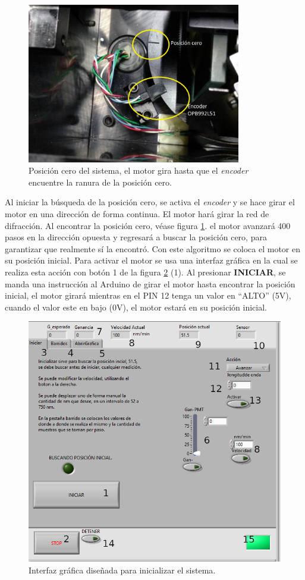 \begin{figure}[h]
	\centering
	\includegraphics[width=0.7\linewidth,height= 7cm]{Imagenes/3/Encoder_01}
	\caption{Posición cero del sistema, el motor gira hasta que el \textit{encoder} encuentre la ranura de la posición cero.}
	\label{fig:encoder01}
\end{figure}

Al iniciar la búsqueda de la posición cero,
se activa el \textit{encoder} y se hace girar el motor en una dirección de forma continua. El motor hará girar la red de difracción. Al encontrar la posición cero, véase figura \ref{fig:encoder01}. el motor avanzará 400 pasos en la dirección opuesta y regresará a buscar la posición cero, para garantizar que realmente sí la encontró.
Con este algoritmo se coloca el motor en su posición inicial. Para activar el motor se usa una interfaz gráfica en la cual se realiza esta acción con botón 1 de la figura \ref{fig:GUI_01} (1). Al presionar \textbf{INICIAR}, se manda una instrucción al Arduino de girar el motor hasta encontrar la posición inicial, el motor girará mientras en el PIN 12 tenga un valor en ``ALTO'' (5V), cuando el valor este en bajo (0V), el motor estará en su posición inicial.

\begin{figure}[h]
	\centering
	\includegraphics[width=0.8\linewidth]{Imagenes/3/GUI_01}
	\caption{Interfaz gráfica diseñada para inicializar el sistema.}
	\label{fig:GUI_01}
\end{figure}


